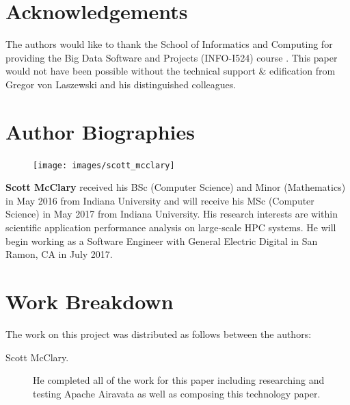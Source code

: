 \documentclass[9pt,twocolumn,twoside]{../../styles/osajnl}
\begin{document}
\section*{Acknowledgements}
The authors would like to thank the School of Informatics and
Computing for providing the Big Data Software and Projects (INFO-I524)
course \cite{www-i524}. This paper would not have been possible
without the technical support \& edification from Gregor von Laszewski
and his distinguished colleagues.

 
\section*{Author Biographies}
\begingroup
\setlength\intextsep{0pt}
\begin{minipage}[t][3.2cm][t]{1.0\columnwidth} 
  \begin{figure}
    \texttt{[image: images/scott\_mcclary]}
  \end{figure}
  \noindent
  {\bfseries Scott McClary} received his BSc (Computer Science) and
  Minor (Mathematics) in May 2016 from Indiana University and will
  receive his MSc (Computer Science) in May 2017 from Indiana
  University. His research interests are within scientific application
  performance analysis on large-scale HPC systems. He will begin
  working as a Software Engineer with General Electric Digital in San
  Ramon, CA in July 2017.
\end{minipage}
\endgroup

\section*{} %
\section*{Work Breakdown}
The work on this project was distributed as follows between the
authors:
\begin{description}
\item[Scott McClary.] He completed all of the work for this paper
  including researching and testing Apache Airavata as well as
  composing this technology paper.
\end{description}


\end{document}

